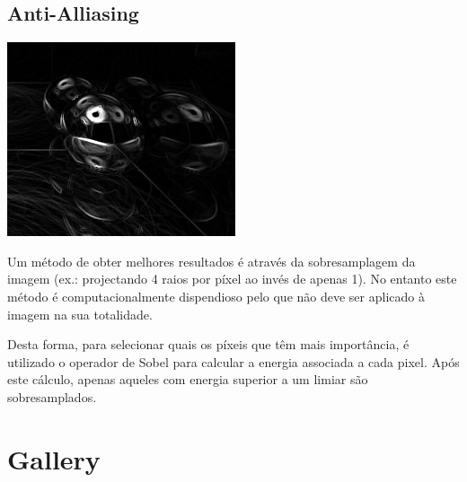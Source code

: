 \documentclass[a4paper]{article}
\begin{document}
\subsection{Anti-Alliasing}
\begin{center}
	\includegraphics[scale=0.50]{images/sobel.png}
	\label{fig:sobel}
\end{center}

\indent Um método de obter melhores resultados é através da sobresamplagem da imagem (ex.: projectando
4 raios por píxel ao invés de apenas 1). No entanto este método é computacionalmente dispendioso pelo que não
deve ser aplicado à imagem na sua totalidade.

\indent Desta forma, para selecionar quais os píxeis que têm mais importância, é utilizado o operador de Sobel
para calcular a energia associada a cada pixel. Após este cálculo, apenas aqueles com energia superior a um limiar
são sobresamplados.

\cleardoublepage
\section{Gallery}
\indent \indent 
\end{document}
